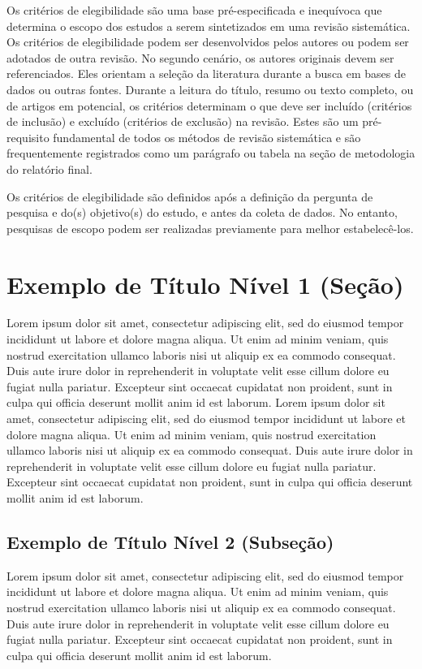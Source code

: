 \documentclass[portuguese]{sbc2025}%
\begin{document}
Os critérios de elegibilidade são uma base pré-especificada e inequívoca que determina o escopo dos estudos a serem sintetizados em uma revisão sistemática. Os critérios de elegibilidade podem ser desenvolvidos pelos autores ou podem ser adotados de outra revisão. No segundo cenário, os autores originais devem ser referenciados. Eles orientam a seleção da literatura durante a busca em bases de dados ou outras fontes. Durante a leitura do título, resumo ou texto completo, ou de artigos em potencial, os critérios determinam o que deve ser incluído (critérios de inclusão) e excluído (critérios de exclusão) na revisão. Estes são um pré-requisito fundamental de todos os métodos de revisão sistemática e são frequentemente registrados como um parágrafo ou tabela na seção de metodologia do relatório final.

Os critérios de elegibilidade são definidos após a definição da pergunta de pesquisa e do(s) objetivo(s) do estudo, e antes da coleta de dados. No entanto, pesquisas de escopo podem ser realizadas previamente para melhor estabelecê-los.



\section{Exemplo de Título Nível 1 (Seção)}
Lorem ipsum dolor sit amet, consectetur adipiscing elit, sed do eiusmod tempor incididunt ut labore et dolore magna aliqua. Ut enim ad minim veniam, quis nostrud exercitation ullamco laboris nisi ut aliquip ex ea commodo consequat. Duis aute irure dolor in reprehenderit in voluptate velit esse cillum dolore eu fugiat nulla pariatur. Excepteur sint occaecat cupidatat non proident, sunt in culpa qui officia deserunt mollit anim id est laborum. Lorem ipsum dolor sit amet, consectetur adipiscing elit, sed do eiusmod tempor incididunt ut labore et dolore magna aliqua. Ut enim ad minim veniam, quis nostrud exercitation ullamco laboris nisi ut aliquip ex ea commodo consequat. Duis aute irure dolor in reprehenderit in voluptate velit esse cillum dolore eu fugiat nulla pariatur. Excepteur sint occaecat cupidatat non proident, sunt in culpa qui officia deserunt mollit anim id est laborum.

\subsection{Exemplo de Título Nível 2 (Subseção)}

Lorem ipsum dolor sit amet, consectetur adipiscing elit, sed do eiusmod tempor incididunt ut labore et dolore magna aliqua. Ut enim ad minim veniam, quis nostrud exercitation ullamco laboris nisi ut aliquip ex ea commodo consequat. Duis aute irure dolor in reprehenderit in voluptate velit esse cillum dolore eu fugiat nulla pariatur. Excepteur sint occaecat cupidatat non proident, sunt in culpa qui officia deserunt mollit anim id est laborum.
\end{document}
